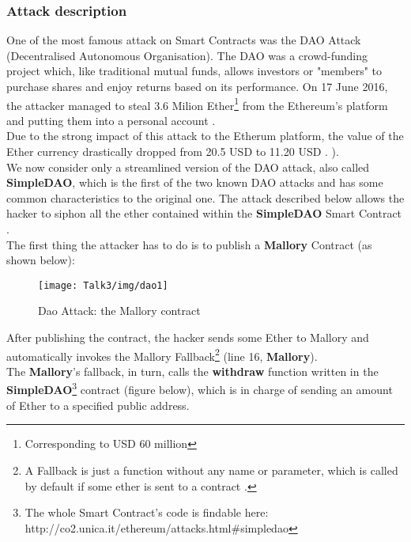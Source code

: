 \subsubsection{Attack description}
One of the most famous attack on Smart Contracts was the DAO Attack (Decentralised Autonomous Organisation)\cite{SC6}.
The DAO was a crowd-funding project which, like traditional mutual funds, allows investors or "members" to purchase shares and enjoy returns based on its performance.
On 17 June 2016, the attacker managed to steal 3.6 Milion Ether\footnote{Corresponding to USD 60 million} from the Ethereum's platform and putting them into a personal account \cite{SC8}.\\ %
Due to the strong impact of this attack to the Etherum platform, the value of the Ether currency drastically dropped from 20.5 USD to 11.20 USD \cite{SC9}.  
). \\
We now consider only a streamlined version of the DAO attack, also called \textbf{SimpleDAO}, which is the first of the two known DAO attacks and has some common characteristics to the original one. The attack described below allows the hacker to siphon all the ether contained within the \textbf{SimpleDAO} Smart Contract \cite{paper2}. \\
The first thing the attacker has to do is to publish a \textbf{Mallory} Contract (as shown below): 
\begin{figure}[H]
\begin{center}
\texttt{[image: Talk3/img/dao1]}
\end{center}
\caption{Dao Attack: the Mallory contract}
\label{label}
\end{figure}
After publishing the contract, the hacker sends some Ether to Mallory and automatically invokes the Mallory Fallback\footnote{A Fallback is just a function without any name or parameter, which is called by default if some ether is sent to a contract \cite{SC10}. } (line 16, \textbf{Mallory}). \\
The \textbf{Mallory}'s fallback, in turn, calls the \textbf{withdraw} function written in the \textbf{SimpleDAO}\footnote{The whole Smart Contract's code is findable here: http://co2.unica.it/ethereum/attacks.html\#simpledao} contract (figure below), which is in charge of sending an amount of Ether to a specified public address. 
